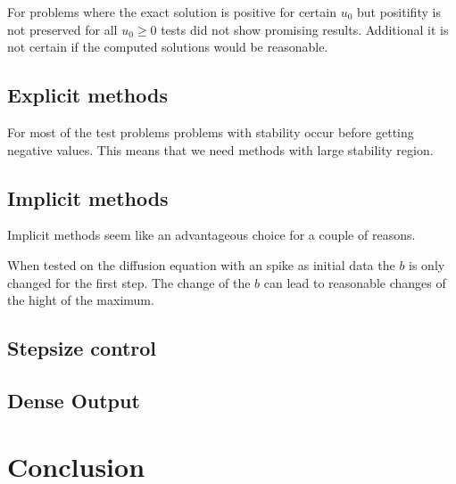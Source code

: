 \documentclass{article}
\begin{document}
For problems where the exact solution is positive for certain $u_0$ but positifity is not preserved for all $u_0 \geq 0$ tests did not show promising results. Additional it is not certain if the computed solutions would be reasonable.


\subsection{Explicit methods}
For most of the test problems problems with stability occur before getting negative values. This means that we need methods with large stability region.



\subsection{Implicit methods}
Implicit methods seem like an advantageous choice for a couple of reasons.

When tested on the diffusion equation with an spike as initial data the $b$ is only changed for the first step. The change of the $b$ can lead to reasonable changes of the hight of the maximum. 

\subsection{Stepsize control}

\subsection{Dense Output}

\section{Conclusion} \label{sec:conclusion}




\printbibliography
\end{document}
